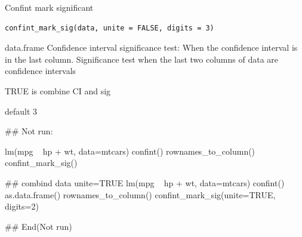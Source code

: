 \documentclass[a4paper]{book}
\begin{document}
%
\begin{Description}
Confint mark significant
\end{Description}
%
\begin{Usage}
\begin{verbatim}
confint_mark_sig(data, unite = FALSE, digits = 3)
\end{verbatim}
\end{Usage}
%
\begin{Arguments}
\begin{ldescription}
\item[\code{data}] data.frame Confidence interval significance test: When the confidence interval is in the last column.  Significance test when the last two columns of data are confidence intervals

\item[\code{unite}] TRUE is combine CI and sig

\item[\code{digits}] default 3
\end{ldescription}
\end{Arguments}
%
\begin{Examples}
\begin{ExampleCode}

\#\# Not run: 

lm(mpg ~ hp + wt, data=mtcars)%
 confint()%
  rownames_to_column()%
  confint_mark_sig()

## combind data unite=TRUE
  lm(mpg ~ hp + wt, data=mtcars)%
     confint()%
     as.data.frame()%
     rownames_to_column()%
     confint_mark_sig(unite=TRUE, digits=2)



  
## End(Not run)

\end{ExampleCode}
\end{Examples}
\end{document}
